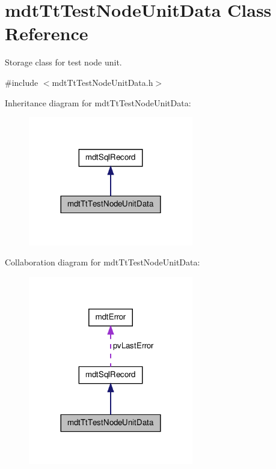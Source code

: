 \hypertarget{classmdt_tt_test_node_unit_data}{\section{mdt\-Tt\-Test\-Node\-Unit\-Data Class Reference}
\label{classmdt_tt_test_node_unit_data}
}


Storage class for test node unit.  




{\ttfamily \#include $<$mdt\-Tt\-Test\-Node\-Unit\-Data.\-h$>$}



Inheritance diagram for mdt\-Tt\-Test\-Node\-Unit\-Data\-:\nopagebreak
\begin{figure}[H]
\begin{center}
\leavevmode
\includegraphics[width=204pt]{classmdt_tt_test_node_unit_data__inherit__graph}
\end{center}
\end{figure}


Collaboration diagram for mdt\-Tt\-Test\-Node\-Unit\-Data\-:\nopagebreak
\begin{figure}[H]
\begin{center}
\leavevmode
\includegraphics[width=204pt]{classmdt_tt_test_node_unit_data__coll__graph}
\end{center}
\end{figure}
